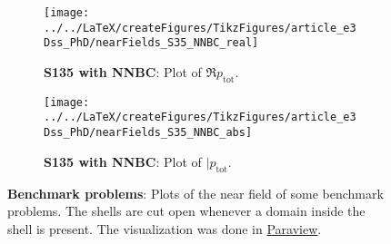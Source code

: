 \begin{figure}
\begin{subfigure}[t]{0.49\textwidth}
		\label{Fig1:S35_SHBC_abs}
	\end{subfigure}%
	\par\bigskip
	\begin{subfigure}[t]{0.49\textwidth}
		\centering
		\texttt{[image: ../../LaTeX/createFigures/TikzFigures/article\_e3Dss\_PhD/nearFields\_S35\_NNBC\_real]}
		\caption{\textbf{S135 with NNBC}: Plot of $\Re p_{\mathrm{tot}}$.}
		\label{Fig1:S35_NNBC_real}
	\end{subfigure}%
	\hspace*{0.02\textwidth}%
	\begin{subfigure}[t]{0.49\textwidth}
		\centering
		\texttt{[image: ../../LaTeX/createFigures/TikzFigures/article\_e3Dss\_PhD/nearFields\_S35\_NNBC\_abs]}
		\caption{\textbf{S135 with NNBC}: Plot of $|p_{\mathrm{tot}}$.}
		\label{Fig1:S35_NNBC_abs}
	\end{subfigure}%
	\caption{\textbf{Benchmark problems}: Plots of the near field of some benchmark problems. The shells are cut open whenever a domain inside the shell is present. The visualization was done in \href{http://www.paraview.org/}{Paraview}.}
	\label{Fig1:Benchmarks_NearField}
\end{figure}

